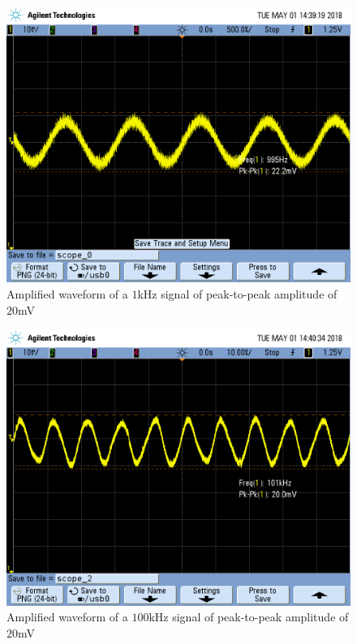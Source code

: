 \begin{figure}[h!]
	\centering
	\includegraphics[scale=0.75]{./images/SCOPE_0.PNG}
	\caption{Amplified waveform of a $1$\si{\kilo\hertz} signal of peak-to-peak amplitude of $20$\si{\milli\volt}}
	\label{fig:SCOPE_0}
\end{figure}

\FloatBarrier

\begin{figure}[h!]
	\centering
	\includegraphics[scale=0.75]{./images/SCOPE_2.PNG}
	\caption{Amplified waveform of a $100$\si{\kilo\hertz} signal of peak-to-peak amplitude of $20$\si{\milli\volt}}
	\label{fig:SCOPE_2}
\end{figure}

